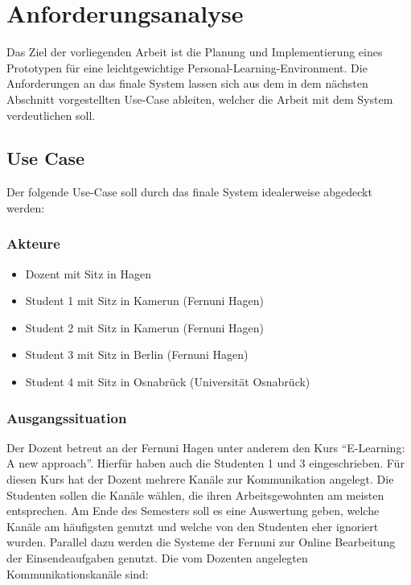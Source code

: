 \chapter{Anforderungsanalyse} 
\label{section:anforderungsanalyse}

Das Ziel der vorliegenden Arbeit ist die Planung und Implementierung eines Prototypen für eine leichtgewichtige Personal-Learning-Environment. Die Anforderungen an das finale System lassen sich aus dem in dem nächsten Abschnitt vorgestellten Use-Case ableiten, welcher die Arbeit mit dem System verdeutlichen soll.

\section{Use Case}
Der folgende Use-Case soll durch das finale System idealerweise abgedeckt werden:

\subsection{Akteure}

\begin{itemize}
 \item Dozent mit Sitz in Hagen
 \item Student 1 mit Sitz in Kamerun (Fernuni Hagen)
 \item Student 2 mit Sitz in Kamerun (Fernuni Hagen)
 \item Student 3 mit Sitz in Berlin (Fernuni Hagen)
 \item Student 4 mit Sitz in Osnabrück (Universität Osnabrück) 
\end{itemize}

\subsection{Ausgangssituation}\label{section:ausgangssituation}
Der Dozent betreut an der Fernuni Hagen unter anderem den Kurs "`E-Learning: A new approach"'. Hierfür haben auch die Studenten 1 und 3 eingeschrieben. Für diesen Kurs hat der Dozent mehrere Kanäle zur Kommunikation angelegt. Die Studenten sollen die Kanäle wählen, die ihren Arbeitsgewohnten am meisten entsprechen. Am Ende des Semesters soll es eine Auswertung geben, welche Kanäle am häufigsten genutzt und welche von den Studenten eher ignoriert wurden. Parallel dazu werden die Systeme der Fernuni zur Online Bearbeitung der Einsendeaufgaben genutzt. Die vom Dozenten angelegten Kommunikationskanäle sind:

